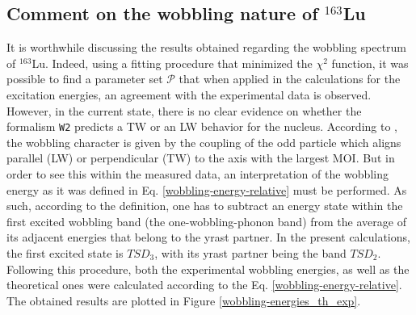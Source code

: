 \documentclass[11pt]{article}
\begin{document}
\subsection{\texorpdfstring{Comment on the wobbling nature of $^{163}$Lu}%
                               {Comment on the wobbling nature of 163Lu}}

It is worthwhile discussing the results obtained regarding the wobbling spectrum of $^{163}$Lu. Indeed, using a fitting procedure that minimized the $\chi^2$ function, it was possible to find a parameter set $\mathcal{P}$ that when applied in the calculations for the excitation energies, an agreement with the experimental data is observed. However, in the current state, there is no clear evidence on whether the formalism \texttt{W2} predicts a TW or an LW behavior for the nucleus. According to \cite{frauendorf2014transverse}, the wobbling character is given by the coupling of the odd particle which aligns parallel (LW) or perpendicular (TW) to the axis with the largest MOI. But in order to see this within the measured data, an interpretation of the wobbling energy as it was defined in Eq. \ref{wobbling-energy-relative} must be performed. As such, according to the definition, one has to subtract an energy state within the first excited wobbling band (the one-wobbling-phonon band) from the average of its adjacent energies that belong to the yrast partner. In the present calculations, the first excited state is $TSD_3$, with its yrast partner being the band $TSD_2$. Following this procedure, both the experimental wobbling energies, as well as the theoretical ones were calculated according to the Eq. \ref{wobbling-energy-relative}. The obtained results are plotted in Figure \ref{wobbling-energies_th_exp}.
\end{document}
